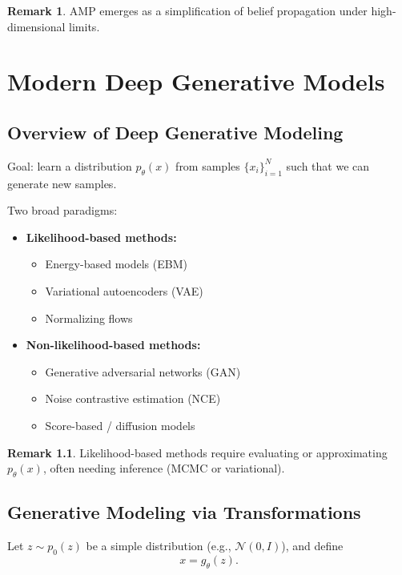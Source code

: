 \documentclass[12pt,oneside]{book}
\numberwithin{equation}{section}
\theoremstyle{definition}
\newtheorem{remark}{Remark}[section]
\theoremstyle{plain}
\theoremstyle{remark}
\newcommand{\Normal}{\mathcal{N}}
\begin{document}
\begin{remark}
AMP emerges as a simplification of belief propagation under high-dimensional limits.
\end{remark}

\chapter{Modern Deep Generative Models}

\section{Overview of Deep Generative Modeling}

Goal: learn a distribution $p_\theta(x)$ from samples $\{x_i\}_{i=1}^N$ such that we can generate new samples.

Two broad paradigms:

\begin{itemize}
    \item \textbf{Likelihood-based methods:}
    \begin{itemize}
        \item Energy-based models (EBM)
        \item Variational autoencoders (VAE)
        \item Normalizing flows
    \end{itemize}
    
    \item \textbf{Non-likelihood-based methods:}
    \begin{itemize}
        \item Generative adversarial networks (GAN)
        \item Noise contrastive estimation (NCE)
        \item Score-based / diffusion models
    \end{itemize}
\end{itemize}

\begin{remark}
Likelihood-based methods require evaluating or approximating $p_\theta(x)$, often needing inference (MCMC or variational).
\end{remark}

\section{Generative Modeling via Transformations}

Let $z \sim p_0(z)$ be a simple distribution (e.g., $\Normal(0,I)$), and define
\[
x = g_\theta(z).
\]
\end{document}
